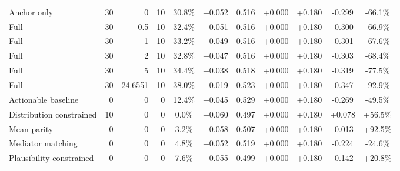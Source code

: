 \begin{table}[htbp]
\begin{tabular}{lrrrccccccc}
Anchor only & 30 & 0 & 10 & 30.8\% & +0.052 & 0.516 & +0.000 & +0.180 & -0.299 & -66.1\% \\
Full & 30 & 0.5 & 10 & 32.4\% & +0.051 & 0.516 & +0.000 & +0.180 & -0.300 & -66.9\% \\
Full & 30 & 1 & 10 & 33.2\% & +0.049 & 0.516 & +0.000 & +0.180 & -0.301 & -67.6\% \\
Full & 30 & 2 & 10 & 32.8\% & +0.047 & 0.516 & +0.000 & +0.180 & -0.303 & -68.4\% \\
Full & 30 & 5 & 10 & 34.4\% & +0.038 & 0.518 & +0.000 & +0.180 & -0.319 & -77.5\% \\
Full & 30 & 24.6551 & 10 & 38.0\% & +0.019 & 0.523 & +0.000 & +0.180 & -0.347 & -92.9\% \\
Actionable baseline & 0 & 0 & 0 & 12.4\% & +0.045 & 0.529 & +0.000 & +0.180 & -0.269 & -49.5\% \\
Distribution constrained & 10 & 0 & 0 & 0.0\% & +0.060 & 0.497 & +0.000 & +0.180 & +0.078 & +56.5\% \\
Mean parity & 0 & 0 & 0 & 3.2\% & +0.058 & 0.507 & +0.000 & +0.180 & -0.013 & +92.5\% \\
Mediator matching & 0 & 0 & 0 & 4.8\% & +0.052 & 0.519 & +0.000 & +0.180 & -0.224 & -24.6\% \\
Plausibility constrained & 0 & 0 & 0 & 7.6\% & +0.055 & 0.499 & +0.000 & +0.180 & -0.142 & +20.8\% \\
\bottomrule
\end{tabular}
\end{table}